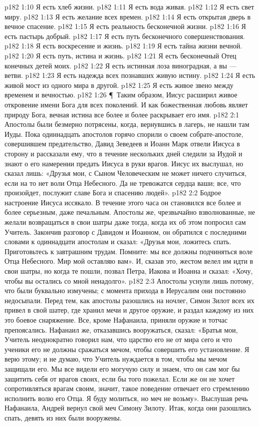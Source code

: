 \vs p182 1:10 Я есть хлеб жизни.
\vs p182 1:11 Я есть вода живая.
\vs p182 1:12 Я есть свет миру.
\vs p182 1:13 Я есть желание всех времен.
\vs p182 1:14 Я есть открытая дверь в вечное спасение.
\vs p182 1:15 Я есть реальность бесконечной жизни.
\vs p182 1:16 Я есть пастырь добрый.
\vs p182 1:17 Я есть путь бесконечного совершенствования.
\vs p182 1:18 Я есть воскресение и жизнь.
\vs p182 1:19 Я есть тайна жизни вечной.
\vs p182 1:20 Я есть путь, истина и жизнь.
\vs p182 1:21 Я есть бесконечный Отец конечных детей моих.
\vs p182 1:22 Я есть истинная лоза виноградная, а вы --- ветви.
\vs p182 1:23 Я есть надежда всех познавших живую истину.
\vs p182 1:24 Я есть живой мост из одного мира в другой.
\vs p182 1:25 Я есть живое звено между временем и вечностью.
\vs p182 1:26 \P\ Таким образом, Иисус расширил живое откровение имени Бога для всех поколений. И как божественная любовь являет природу Бога, вечная истина все более и более раскрывает его имя.
\vs p182 2:1 Апостолы были безмерно потрясены, когда, вернувшись в лагерь, не нашли там Иуды. Пока одиннадцать апостолов горячо спорили о своем собрате\hyp{}апостоле, совершившем предательство, Давид Зеведеев и Иоанн Марк отвели Иисуса в сторону и рассказали ему, что в течение нескольких дней следили за Иудой и знают о его намерении предать Иисуса в руки врагов. Иисус их выслушал, но сказал лишь: «Друзья мои, с Сыном Человеческим не может ничего случиться, если на то нет воли Отца Небесного. Да не тревожатся сердца ваши; все, что произойдет, послужит славе Бога и спасению людей».
\vs p182 2:2 Бодрое настроение Иисуса иссякало. В течение этого часа он становился все более и более серьезным, даже печальным. Апостолы же, чрезвычайно взволнованные, не желали возвращаться в свои шатры даже тогда, когда их об этом попросил сам Учитель. Закончив разговор с Давидом и Иоанном, он обратился с последними словами к одиннадцати апостолам и сказал: «Друзья мои, ложитесь спать. Приготовьтесь к завтрашним трудам. Помните: мы все должны подчиняться воле Отца Небесного. Мир мой оставляю вам». И, сказав это, жестом велел им идти в свои шатры, но когда те пошли, позвал Петра, Иакова и Иоанна и сказал: «Хочу, чтобы вы остались со мной ненадолго».
\vs p182 2:3 Апостолы уснули лишь потому, что были буквально измучены; с момента прихода в Иерусалим они постоянно недосыпали. Перед тем, как апостолы разошлись на ночлег, Симон Зилот всех их привел в свой шатер, где хранил мечи и другое оружие, и раздал каждому из них это боевое снаряжение. Все, кроме Нафанаила, приняли оружие и тотчас препоясались. Нафанаил же, отказавшись вооружаться, сказал: «Братья мои, Учитель неоднократно говорил нам, что царство его не от мира сего и что ученики его не должны сражаться мечом, чтобы совершить его установление. Я верю этому; и не думаю, что Учитель нуждается в том, чтобы мы мечом защищали его. Мы все видели его могучую силу и знаем, что он сам мог бы защитить себя от врагов своих, если бы того пожелал. Если же он не хочет сопротивляться врагам своим, значит, такое поведение отвечает его стремлению исполнить волю его Отца. Я буду молиться, но меч не возьму». Выслушав речь Нафанаила, Андрей вернул свой меч Симону Зилоту. Итак, когда они разошлись спать, девять из них были вооружены.
